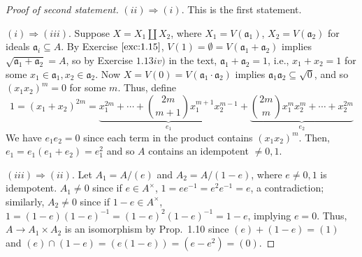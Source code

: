 \documentclass[12pt,letterpaper]{article}
\theoremstyle{definition}
\theoremstyle{remark}
\numberwithin{figure}{problem}
\numberwithin{equation}{section}
\begin{document}
\begin{proof}[Proof of second statement]
  $(ii) \Rightarrow (i)$. This is the first statement.
  \par $(i) \Rightarrow (iii)$. Suppose $X = X_1 \amalg X_2$, where $X_1 = V(\mathfrak{a}_1)$, $X_2 = V(\mathfrak{a}_2)$ for ideals $\mathfrak{a}_i \subseteq A$. By Exercise $\ref{exc:1.15}$, $V(1) = \emptyset = V(\mathfrak{a}_1 + \mathfrak{a}_2)$ implies $\sqrt{\mathfrak{a}_1 + \mathfrak{a}_2} = A$, so by Exercise $1.13iv)$ in the text, $\mathfrak{a}_1 + \mathfrak{a}_2 = 1$, i.e., $x_1 + x_2 = 1$ for some $x_1 \in \mathfrak{a}_1,x_2\in\mathfrak{a}_2$. Now $X = V(0) = V(\mathfrak{a}_1\cdot\mathfrak{a}_2)$ implies $\mathfrak{a}_1\mathfrak{a}_2 \subseteq \sqrt{0}$, and so $(x_1x_2)^m = 0$ for some $m$. Thus, define
  \begin{equation*}
    1 = (x_1 + x_2)^{2m} = \underbrace{x_1^{2m} + \cdots + \binom{2m}{m+1} x_1^{m+1}x_2^{m-1}}_{e_1} + \underbrace{\binom{2m}{m}x_1^mx_2^m + \cdots + x_2^{2m}}_{e_2}
  \end{equation*}
  We have $e_1e_2 = 0$ since each term in the product contains $(x_1x_2)^m$. Then, $e_1 = e_1(e_1 + e_2) = e_1^2$ and so $A$ contains an idempotent $\ne 0,1$.
  \par $(iii) \Rightarrow (ii)$. Let $A_1 = A/(e)$ and $A_2 = A/(1-e)$, where $e \ne0,1$ is idempotent. $A_1 \ne 0$ since if $e \in A^\times$, $1 = ee^{-1} = e^2e^{-1} = e$, a contradiction; similarly, $A_2 \ne 0$ since if $1-e \in A^\times$, $1 = (1-e)(1-e)^{-1} = (1-e)^2(1-e)^{-1} = 1-e$, implying $e=0$. Thus, $A \to A_1 \times A_2$ is an isomorphism by Prop.~1.10 since $(e) + (1-e) = (1)$ and $(e) \cap (1-e) = (e(1-e)) = (e-e^2) = (0)$.
\end{proof}
\end{document}
